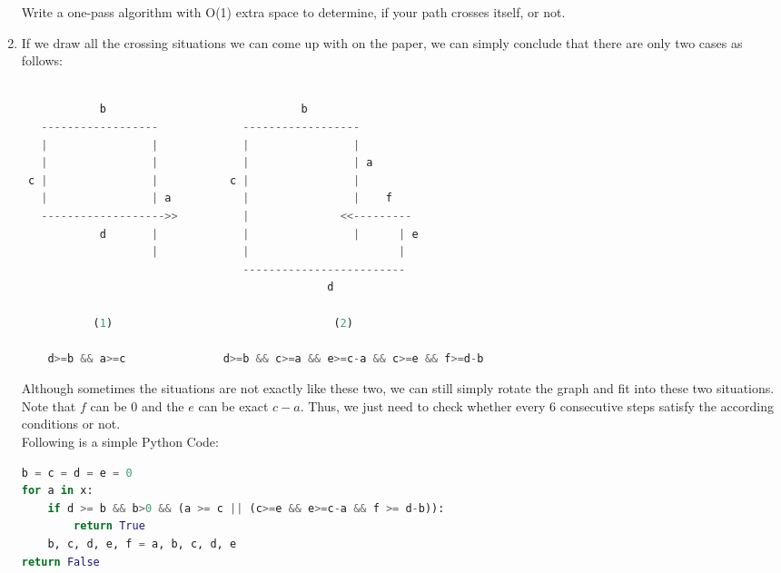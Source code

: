 \documentclass[12pt,a4paper]{article}
\makeatletter
\newtheorem*{solution}{Solution}
\renewenvironment{solution}[1][Solution] {\par\pushQED{\qed}\normalfont\topsep6\p@\@plus6\p@\relax\trivlist\item[\hskip\labelsep\bfseries#1\@addpunct{.}]\ignorespaces}{\popQED\endtrivlist\@endpefalse} \makeatother
\makeatother
\begin{document}
\begin{enumerate}
Write a one-pass algorithm with O(1) extra space to determine, if your path crosses itself, or not.


\begin{solution}

If we draw all the crossing situations we can come up with on the paper, we can simply conclude that there are only two cases as follows:

\begin{lstlisting}[language=Python] 

            b                              b
   ------------------             ------------------
   |                |             |                |
   |                |             |                | a
 c |                |           c |                |
   |                | a           |                |    f
   ------------------->>          |              <<---------
            d       |             |                |      | e
                    |             |                       |
                                  -------------------------
                                               d

           (1)                                  (2)

    d>=b && a>=c               d>=b && c>=a && e>=c-a && c>=e && f>=d-b 
\end{lstlisting}

Although sometimes the situations are not exactly like these two, we can still simply rotate the graph and fit into these two situations. Note that $f$ can be $0$ and the $e$ can be exact $c-a$.
Thus, we just need to check whether every 6 consecutive steps satisfy the according conditions or not. \\Following is a simple Python Code:


\begin{lstlisting}[language=Python] 
b = c = d = e = 0
for a in x:
    if d >= b && b>0 && (a >= c || (c>=e && e>=c-a && f >= d-b)):
        return True
    b, c, d, e, f = a, b, c, d, e
return False

\end{lstlisting}

\end{solution}
~\\
~\\

\end{enumerate}
\end{document}
